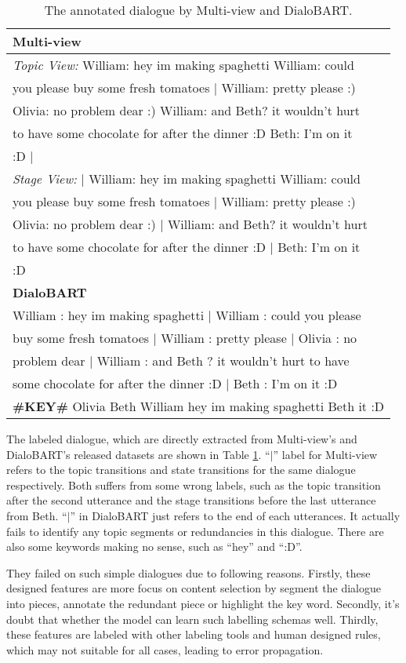 \begin{table}[h]
	\centering
	\small
	\begin{tabular}{l}
		\toprule[1pt]
		\textbf{Multi-view} \\
		\hline
		\textit{Topic View:} William: hey im making spaghetti William: could\\ you please buy some fresh tomatoes \textbf{$\mid$} William: pretty please :) \\Olivia: no problem dear :) William: and Beth? it wouldn't hurt\\ to have some chocolate for after the dinner :D Beth: I'm on it\\ :D \textbf{$\mid$}\\
		\textit{Stage View:} \textbf{$\mid$} William: hey im making spaghetti William: could\\you please buy some fresh tomatoes \textbf{$\mid$} William: pretty please :) \\Olivia: no problem dear :) \textbf{$\mid$} William: and Beth? it wouldn't hurt\\to have some chocolate for after the dinner :D \textbf{$\mid$} Beth: I'm on it\\:D\\
		\hline
		\textbf{DialoBART} \\
		\hline
		William : hey im making spaghetti \textbf{$\mid$} William : could you please\\buy some fresh tomatoes \textbf{$\mid$} William : pretty please \textbf{$\mid$} Olivia : no\\problem dear \textbf{$\mid$} William : and Beth ? it wouldn't hurt to have\\ some chocolate for after the dinner :D \textbf{$\mid$} Beth : I'm on it :D \\\textbf{\#KEY\#} Olivia Beth William hey im making spaghetti Beth it :D\\
		\bottomrule[1pt]
	\end{tabular}
	\caption{The annotated dialogue by Multi-view and DialoBART.}
	\label{tab:annodial}
\end{table}



The labeled dialogue, which are directly extracted from Multi-view's and DialoBART's released datasets are shown in Table \ref{tab:annodial}. ``$\mid$'' label for Multi-view refers to the topic transitions and state transitions for the same dialogue respectively. Both suffers from some wrong labels, such as the topic transition after the second utterance and the stage transitions before the last utterance from Beth.  ``$\mid$'' in DialoBART just refers to the end of each utterances. It actually fails to identify any topic segments or redundancies in this dialogue. There are also some keywords making no sense, such as ``hey'' and ``:D''.

They failed on such simple dialogues due to following reasons. Firstly, these designed features are more focus on content selection by segment the dialogue into pieces, annotate the redundant piece or highlight the key word. Secondly, it's doubt that whether the model can learn such labelling schemas well. Thirdly, these features are labeled with other labeling tools and human designed rules, which may not suitable for all cases, leading to error propagation.